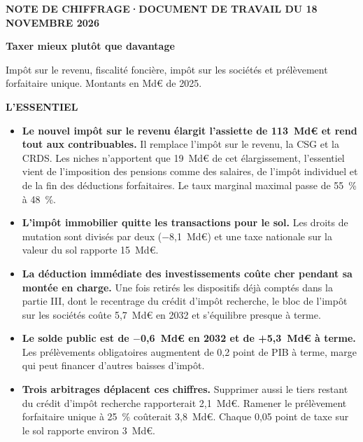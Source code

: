\documentclass[10pt,a4paper]{article}
\begin{document}
\begin{tcolorbox}[colback=bleu,colframe=bleu,arc=0pt,boxrule=0pt,left=10pt,right=10pt,top=8pt,bottom=8pt]
{\footnotesize\color{white}\bfseries NOTE DE CHIFFRAGE\quad·\quad DOCUMENT DE TRAVAIL DU 18 NOVEMBRE 2026\par}
\vspace{4pt}
{\fontsize{21}{25}\selectfont\bfseries\color{white}Taxer mieux plutôt que davantage\par}
\vspace{3pt}
{\large\color{white} Impôt sur le revenu, fiscalité foncière, impôt sur les sociétés et prélèvement forfaitaire unique. Montants en Md€ de 2025.\par}
\end{tcolorbox}


\begin{enbref}
{\bfseries\color{bleu}L'ESSENTIEL}\par\vspace{3pt}
\begin{itemize}[leftmargin=12pt,itemsep=2pt,topsep=0pt]
\item \textbf{Le nouvel impôt sur le revenu élargit l'assiette de 113~Md€ et rend tout aux contribuables.} Il remplace
l'impôt sur le revenu, la CSG et la CRDS. Les niches n'apportent que 19~Md€ de cet élargissement, l'essentiel vient de
l'imposition des pensions comme des salaires, de l'impôt individuel et de la fin des déductions forfaitaires. Le taux
marginal maximal passe de 55~\% à 48~\%.
\item \textbf{L'impôt immobilier quitte les transactions pour le sol.} Les droits de mutation sont divisés par deux
($-$8,1~Md€) et une taxe nationale sur la valeur du sol rapporte 15~Md€.
\item \textbf{La déduction immédiate des investissements coûte cher pendant sa montée en charge.} Une fois retirés les
dispositifs déjà comptés dans la partie III, dont le recentrage du crédit d'impôt recherche, le bloc de l'impôt sur les
sociétés coûte 5,7~Md€ en 2032 et s'équilibre presque à terme.
\item \textbf{Le solde public est de $-$0,6~Md€ en 2032 et de +5,3~Md€ à terme.} Les prélèvements obligatoires
augmentent de 0,2 point de PIB à terme, marge qui peut financer d'autres baisses d'impôt.
\item \textbf{Trois arbitrages déplacent ces chiffres.} Supprimer aussi le tiers restant du crédit d'impôt recherche
rapporterait 2,1~Md€. Ramener le prélèvement forfaitaire unique à 25~\% coûterait 3,8~Md€. Chaque 0,05 point de taxe sur
le sol rapporte environ 3~Md€.
\end{itemize}
\end{enbref}
\end{document}
